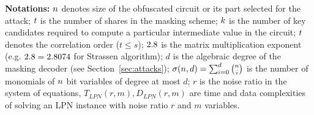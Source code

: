{\begin{table}
    {\bf Notations:}
    $n$ denotes size of the obfuscated circuit or its part selected for the attack;
    $t$ is the number of shares in the masking scheme;
    $k$ is the number of key candidates required to compute a particular intermediate value in the circuit;
    $t$ denotes the correlation order ($t \le s$);
    ${2.8}$ is the matrix multiplication exponent (e.g. ${2.8} = 2.8074$ for Strassen algorithm);
    $d$ is the algebraic degree of the masking decoder (see Section~\ref{sec:attacks});
    $\sigma(n,d) = \sum_{i=0}^d \binom{n}{i}$ is the number of monomials of $n$ bit variables of degree at most $d$;
    $r$ is the noise ratio in the system of equations, $T_{LPN}(r,m),D_{LPN}(r,m)$ are time and data complexities of solving an LPN instance with noise ratio $r$ and $m$ variables.
\end{table}
}